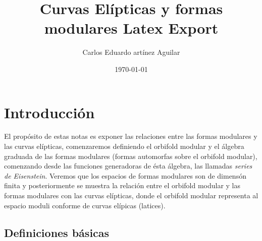 \documentclass[letterpaper]{article}
\author{Carlos Eduardo artínez Aguilar}
\date{\today}
\title{Curvas Elípticas y formas modulares Latex Export}
\begin{document}
\maketitle
\tableofcontents


\section{Introducción}
\label{sec:org1871db7}
El propósito de estas notas es exponer las relaciones entre las formas modulares y las curvas elípticas, comenzaremos definiendo el orbifold modular y el álgebra graduada de las formas modulares (formas automorfas sobre el orbifold modular), comenzando desde las funciones generadoras de ésta álgebra, las llamadas \emph{series de Eisenstein}. Veremos que los espacios de formas modulares son de dimensón finita y posteriormente se muestra la relación entre el orbifold modular y las formas modulares con las curvas elípticas, donde el orbifold modular representa al espacio moduli conforme de curvas elípicas (latices).
\subsection{Definiciones básicas}
\label{sec:org7cc319c}
\end{document}
